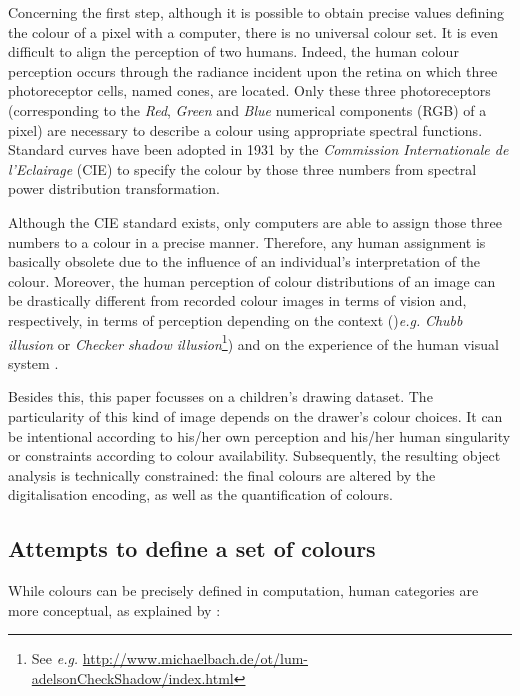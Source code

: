 \documentclass[11pt,a4paper]{article}
\begin{document}
Concerning the first step, although it is possible to obtain precise values defining the colour of a pixel with a computer, there is no universal colour set.
It is even difficult to align the perception of two humans.
Indeed, the human colour perception occurs through the radiance incident upon
the retina on which three photoreceptor cells, named cones, are located.
Only these three photoreceptors (corresponding to the \emph{Red}, \emph{Green} and \emph{Blue} numerical components (RGB) of a pixel) are necessary to describe a colour using appropriate spectral functions. Standard curves have been adopted in 1931 by the \textit{Commission Internationale de l'Eclairage} (CIE) to specify the colour by those three numbers from spectral power distribution transformation.

Although the CIE standard exists, only computers are able to assign
those three numbers to a colour in a precise manner. Therefore, any
human assignment is basically obsolete due to the influence of an
individual's interpretation of the colour. 
Moreover, the human perception of colour distributions of an image can be
drastically different from recorded colour images in terms of vision \cite[see \textit{e.g.}][]{jobson1997} and,
respectively, in terms of perception depending on the context ()\textit{e.g.}
\emph{Chubb illusion}  \cite{ChubbSperlingSolomon1989} or \emph{Checker shadow illusion}\footnote{See \textit{e.g.} \url{http://www.michaelbach.de/ot/lum-adelsonCheckShadow/index.html}}) and on the experience of the human visual system \cite[see \textit{e.g.}][]{LottoPurves2001}.


Besides this, this paper focusses on a children's drawing dataset. 
The particularity of this kind of image depends on the drawer's
colour choices. It can be intentional according to his/her own
perception and his/her human singularity or constraints according to
colour availability. Subsequently, the resulting object analysis is
technically constrained: the final colours are altered by the
digitalisation encoding, as well as the quantification of colours.


\subsection{Attempts to define a set of colours}

While colours can be precisely defined in computation, human categories
are more conceptual, as explained by \citet{wittgenstein1977}:
\end{document}
